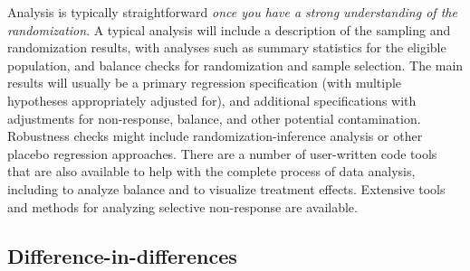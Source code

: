 Analysis is typically straightforward \textit{once you have a strong understanding of the randomization}.
A typical analysis will include a description of the sampling and randomization results,
with analyses such as summary statistics for the eligible population,
and balance checks for randomization and sample selection.
The main results will usually be a primary regression specification
(with multiple hypotheses appropriately adjusted for),
and additional specifications with adjustments for non-response, balance, and other potential contamination.
Robustness checks might include randomization-inference analysis or other placebo regression approaches.
There are a number of user-written code tools that are also available
to help with the complete process of data analysis,
including to analyze balance
and to visualize treatment effects.
Extensive tools and methods for analyzing selective non-response are available.

\subsection{Difference-in-differences}

